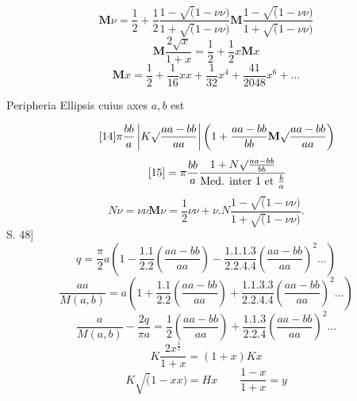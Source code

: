 \ClosingRule
\begin{equation}\tag*{[11]}\mathbf{M}\nu=\frac12+\frac12\frac{1-\surd(1-\nu\nu)}{1+\surd(1-\nu\nu)}\mathbf{M}\frac{1-\surd(1-\nu\nu)}{1+\surd(1-\nu\nu)}\end{equation}
\begin{equation}\tag*{[12]}\mathbf{M}\frac{2\surd x}{1+x}=\frac12+\frac12x\mathbf{M}x\end{equation}
\begin{equation}\tag*{[13]}\mathbf{M}x=\frac12+\frac1{16}xx+\frac1{32}x^4+\frac{41}{2048}x^6+\ldots\end{equation}
\ClosingRule
\begin{center}Peripheria Ellipsis cuius axes \(a,b\) est\end{center}
\begin{equation}\tag*{[14]}\pi\frac{bb}{a}\left|K\surd\frac{aa-bb}{aa}\right|\left(1+\frac{aa-bb}{bb}\mathbf{M}\surd\frac{aa-bb}{aa}\right)\end{equation}
\begin{equation}\tag*{[15]}=\pi\frac{bb}{a}\frac{1+N\surd\frac{aa-bb}{bb}}{\text{Med. inter 1 et }\frac ba}\end{equation}
\begin{equation}\tag*{[16]}N\nu=\nu\nu\mathbf{M}\nu=\frac12\nu\nu+\nu.N\frac{1-\surd(1-\nu\nu)}{1+\surd(1-\nu\nu)}.\end{equation}
\noindent S. 48]
\begin{equation}\tag*{[17]}q=\frac\pi2a\left(1-\frac{1.1}{2.2}\left(\frac{aa-bb}{aa}\right)-\frac{1.1.1.3}{2.2.4.4}\left(\frac{aa-bb}{aa}\right)^2\ldots\right)\end{equation}
\begin{equation}\tag*{[18]}\frac{aa}{M(a,b)}=a\left(1+\frac{1.1}{2.2}\left(\frac{aa-bb}{aa}\right)+\frac{1.1.3.3}{2.2.4.4}\left(\frac{aa-bb}{aa}\right)^2\ldots\right)\end{equation}
\begin{equation}\tag*{[19]}\frac{a}{M(a,b)}-\frac{2q}{\pi a}=\frac12\left(\frac{aa-bb}{aa}\right)+\frac{1.1.3}{2.2.4}\left(\frac{aa-bb}{aa}\right)^2\ldots\end{equation}
\ClosingRule
\clearpage
{}\fancyhead{}
\noindent [S. 49]
\begin{equation}\tag*{[20]}K\frac{2x^{\frac12}}{1+x}=(1+x)Kx\end{equation}
\begin{equation}\tag*{[21]}K\surd(1-xx)=Hx\qquad\frac{1-x}{1+x}=y\end{equation}
